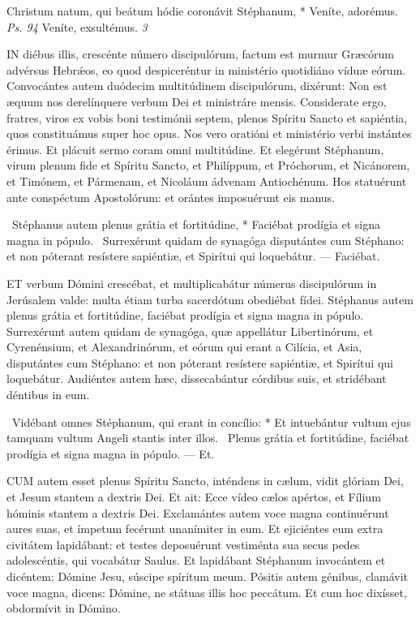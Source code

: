 
 Christum natum, qui beátum hódie coronávit Stéphanum, * Veníte, adorémus. \textit{Ps. 94} Veníte, exsultémus. \textit{3}




\lettrine[lines=2]{I}{N} diébus illis, crescénte número discipulórum, factum est murmur Græcórum advérsus Hebrǽos, eo quod despiceréntur in ministério quotidiáno víduæ eórum. Convocántes autem duódecim multitúdinem discipulórum, dixérunt: Non est æquum nos derelínquere verbum Dei et ministráre mensis. Considerate ergo, fratres, viros ex vobis boni testimónii septem, plenos Spíritu Sancto et sapiéntia, quos constituámus super hoc opus. Nos vero oratióni et ministério verbi instántes érimus. Et plácuit sermo coram omni multitúdine. Et elegérunt Stéphanum, virum plenum fide et Spíritu Sancto, et Philíppum, et Próchorum, et Nicánorem, et Timónem, et Pármenam, et Nicoláum ádvenam Antiochénum. Hos statuérunt ante conspéctum Apostolórum: et orántes imposuérunt eis manus.

\R\ Stéphanus autem plenus grátia et fortitúdine, * Faciébat prodígia et signa magna in pópulo. \V\ Surrexérunt quidam de synagóga disputántes cum Stéphano: et non póterant resístere sapiéntiæ, et Spirítui qui loquebátur. --- Faciébat.


\lettrine[lines=2]{E}{T} verbum Dómini crescébat, et multiplicabátur númerus discipulórum in Jerúsalem valde: multa étiam turba sacerdótum obediébat fídei. Stéphanus autem plenus grátia et fortitúdine, faciébat prodígia et signa magna in pópulo. Surrexérunt autem quidam de synagóga, quæ appellátur Libertinórum, et Cyrenénsium, et Alexandrinórum, et eórum qui erant a Cilícia, et Asia, disputántes cum Stéphano: et non póterant resístere sapiéntiæ, et Spirítui qui loquebátur. Audiéntes autem hæc, dissecabántur córdibus suis, et stridébant déntibus in eum.

\R\ Vidébant omnes Stéphanum, qui erant in concílio: * Et intuebántur vultum ejus tamquam vultum Angeli stantis inter illos. \V\ Plenus grátia et fortitúdine, faciébat prodígia et signa magna in pópulo. --- Et.


\lettrine[lines=2]{C}{UM} autem esset plenus Spíritu Sancto, inténdens in cælum, vidit glóriam Dei, et Jesum stantem a dextris Dei. Et ait: Ecce vídeo cælos apértos, et Fílium hóminis stantem a dextris Dei. Exclamántes autem voce magna continuérunt aures suas, et ímpetum fecérunt unanímiter in eum. Et ejiciéntes eum extra civitátem lapidábant: et testes deposuérunt vestiménta sua secus pedes adolescéntis, qui vocabátur Saulus. Et lapidábant Stéphanum invocántem et dicéntem: Dómine Jesu, súscipe spíritum meum. Pósitis autem génibus, clamávit voce magna, dicens: Dómine, ne státuas illis hoc peccátum. Et cum hoc dixísset, obdormívit in Dómino.

